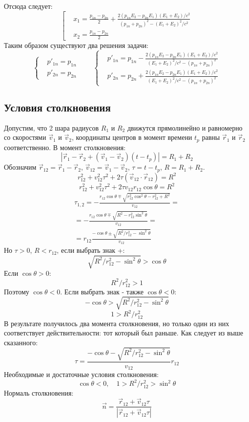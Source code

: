 Отсюда следует:
\[
	\left[
	\begin{aligned}
		& x_1 = \frac{p_{1n} - p_{2n}}{2} + \frac{2 (p_{1n} E_2 - p_{2n} E_1) (E_1 + E_2)/c^2}{(p_{1n} + p_{2n})^2 - (E_1 + E_2)^2/c^2} \\
		& x_2 = \frac{p_{1n} - p_{2n}}{2}
	\end{aligned}
	\right.
\]
Таким образом существуют два решения задачи:
\[
	\left\{
	\begin{aligned}
	& p'_{1n} = p_{1n} \\
	& p'_{2n} = p_{2n}
	\end{aligned}
	\right.
	\qquad	
	\left\{
	\begin{aligned}
	& p'_{1n} = p_{1n} - \frac{2 (p_{1n} E_2 - p_{2n} E_1) (E_1 + E_2)/c^2}{(E_1 + E_2)^2/c^2 - (p_{1n} + p_{2n})^2} \\
	& p'_{2n} = p_{2n} + \frac{2 (p_{1n} E_2 - p_{2n} E_1) (E_1 + E_2)/c^2}{(E_1 + E_2)^2/c^2 - (p_{1n} + p_{2n})^2}
	\end{aligned}
	\right.
\]

\subsection{Условия столкновения}

Допустим, что 2 шара радиусов $R_1$ и $R_2$ движутся прямолинейно и равномерно со скоростями $\vec{v}_1$ и $\vec{v}_2$, координаты центров в момент времени $t_p$ равны $\vec{r}_1$ и $\vec{r}_2$ соответственно. В момент столкновения:
\[
	|\vec{r}_1  - \vec{r}_2 + (\vec{v}_1 - \vec{v}_2) (t - t_p)| = R_1 + R_2
\] 
Обозначим $\vec{r}_{12} = \vec{r}_1  - \vec{r}_2$, $\vec{v}_{12} = \vec{v}_1 - \vec{v}_2$, $\tau = t - t_p$, $R = R_1 + R_2$.
\[
	r_{12}^2 + v_{12}^2 \tau^2 + 2 \tau (\vec{v}_{12}\cdot\vec{r}_{12}) = R^2
\]
\[
	r_{12}^2 + v_{12}^2 \tau^2 + 2 \tau v_{12} r_{12} \cos \theta  = R^2
\]
\[
	\begin{gathered}
	\tau_{1,2} = - \frac{r_{12} \cos \theta \mp \sqrt{r_{12}^2 \cos^2 \theta - r_{12}^2  + R^2}}{v_{12}} =
	\\ = - \frac{r_{12} \cos \theta \mp \sqrt{R^2 - r_{12}^2 \sin^2 \theta}}{v_{12}} =
	\\ = r_{12} \frac{ - \cos \theta \pm \sqrt{R^2/r_{12}^2 - \sin^2 \theta}}{v_{12}}
	\end{gathered} 
\]
Но $\tau > 0$, $R < r_{12}$, если выбрать знак +:
\[
	\sqrt{R^2/r_{12}^2 - \sin^2 \theta} > \cos \theta
\]
Если $\cos \theta > 0$:
\[
	R^2/r_{12}^2 > 1
\]
Поэтому $\cos \theta < 0$. Если выбрать знак - также $\cos \theta < 0$:
\[
	- \cos \theta > \sqrt{R^2/r_{12}^2 - \sin^2 \theta}
\]
\[
	1 > R^2/r_{12}^2
\]
В результате получилось два момента столкновения, но только один из них соответствует действительности: тот который был раньше. Как следует из выше сказанного: 
\[
	\tau = \frac{ - \cos \theta - \sqrt{R^2/r_{12}^2 - \sin^2 \theta}}{v_{12}} r_{12} 
\]
Необходимые и достаточные условия столкновения:
\[
	\cos \theta < 0, \quad 1 > R^2/r_{12}^2 > \sin^2 \theta 
\]
Нормаль столкновения:
\[
	\vec{n} = \frac{\vec{r}_{12} + \vec{v}_{12} \tau}{|\vec{r}_{12} + \vec{v}_{12} \tau|}
\]
